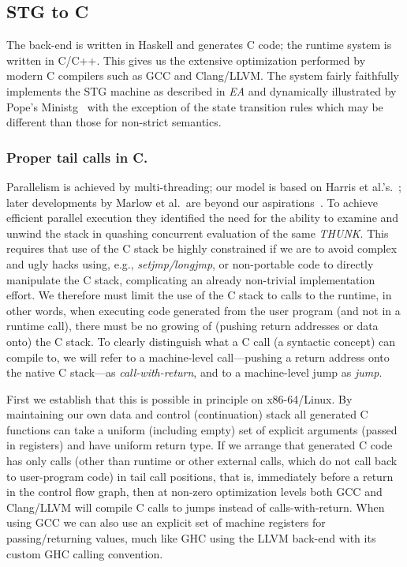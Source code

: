 \documentclass{llncs}
\begin{document}
\subsection{STG to C}
The back-end is written in Haskell and generates C code; the runtime system is
written in C/C++. This gives us the extensive optimization performed by modern
C compilers such as GCC and Clang/LLVM. The system fairly faithfully
implements the STG machine as described in \emph{EA} and dynamically
illustrated by Pope's Ministg~\cite{ministg} with the exception of the state
transition rules which may be different than those for non-strict semantics.

\subsubsection{Proper tail calls in C.}
Parallelism is achieved by multi-threading; our model is based on Harris et
al.'s.~\cite{Harris:2005}; later developments by Marlow et al.\ are beyond our
aspirations~\cite{Marlow:2009,Marlow:2011}.  To achieve efficient parallel
execution they identified the need for the ability to examine and unwind the
stack in quashing concurrent evaluation of the same \emph{THUNK}\@.  This
requires that use of the C stack be highly constrained if we are to avoid
complex and ugly hacks using, e.g., \emph{setjmp/longjmp}, or non-portable
code to directly manipulate the C stack, complicating an already non-trivial
implementation effort.  We therefore must limit the use of the C stack to
calls to the runtime, in other words, when executing code generated from the
user program (and not in a runtime call), there must be no growing of (pushing
return addresses or data onto) the C stack.
%
To clearly distinguish what a C call (a syntactic concept) can compile to, we
will refer to a machine-level call---pushing a return address onto the native
C stack---as \emph{call-with-return}, and to a machine-level jump as
\emph{jump}.

First we establish that this is possible in principle on x86-64/Linux.  By
maintaining our own data and control (continuation) stack all generated C
functions can take a uniform (including empty) set of explicit arguments
(passed in registers) and have uniform return type. If we arrange that
generated C code has only calls (other than runtime or other external calls,
which do not call back to user-program code) in tail call positions, that is,
immediately before a return in the control flow graph, then at non-zero
optimization levels both GCC and Clang/LLVM will compile C calls to jumps
instead of calls-with-return.  When using GCC we can also use an explicit set
of machine registers for passing/returning values, much like GHC using the
LLVM back-end with its custom GHC calling convention.
\end{document}
